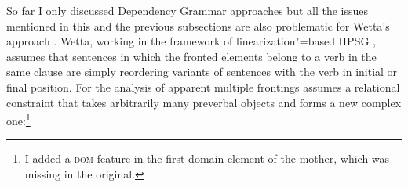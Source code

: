 So far I only discussed Dependency Grammar approaches but all the issues mentioned in this and the
previous subsections are also problematic for Wetta's approach
\citeyearpar{Wetta2011a,Wetta2014a-u}. Wetta, working in the framework of linearization"=based HPSG 
\citep{Reape94a,Kathol95a,Kathol2001a,Mueller99a,Mueller2002b}, assumes that sentences in which
the
fronted elements belong to a verb in the same clause are simply reordering variants of sentences
with the verb in initial or final position. For the analysis of apparent multiple frontings \citet{Wetta2011a}
assumes a relational constraint that takes arbitrarily many preverbal objects and forms a new complex
one:\footnote{
  I added a \textsc{dom} feature in the first domain element of the mother, which was missing in the
  original.
}
